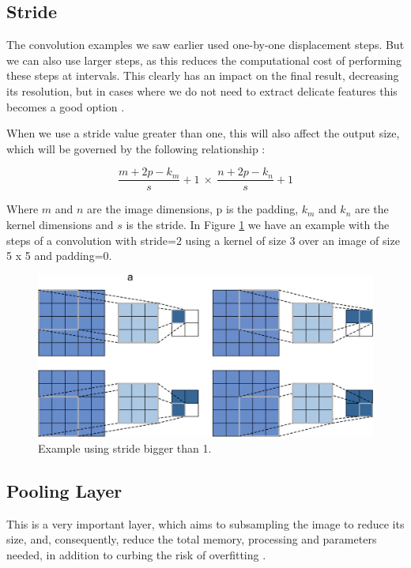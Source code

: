 \subsection{Stride}

The convolution examples we saw earlier used one-by-one displacement steps. But we can also use larger steps, as this reduces the computational cost of performing these steps at intervals. This clearly has an impact on the final result, decreasing its resolution, but in cases where we do not need to extract delicate features this becomes a good option \cite{goodfellow2016}.

When we use a stride value greater than one, this will also affect the output size, which will be governed by the following relationship \cite{adrian2017}:

\begin{equation}
\frac{m+2p-k_m}{s}+1 \  \times \ \frac{n+2p-k_n}{s}+1
\end{equation}

Where $m$ and $n$ are the image dimensions, p is the padding, $k_m$ and $k_n$ are the kernel dimensions and $s$ is the stride. In Figure \ref{fig:stride} we have an example with the steps of a convolution with stride=2 using a kernel of size 3 over an image of size 5 x 5 and padding=0.

\begin{figure}
    \centering
    \includegraphics[scale=0.20]{images/stride.png}
    \caption{Example using stride bigger than 1.}
    \label{fig:stride}
\end{figure}

\subsection{Pooling Layer}

This is a very important layer, which aims to subsampling the image to reduce its size, and, consequently, reduce the total memory, processing and parameters needed, in addition to curbing the risk of overfitting \cite{geron2019}\cite{adrian2017}\cite{elgendy2020}.

